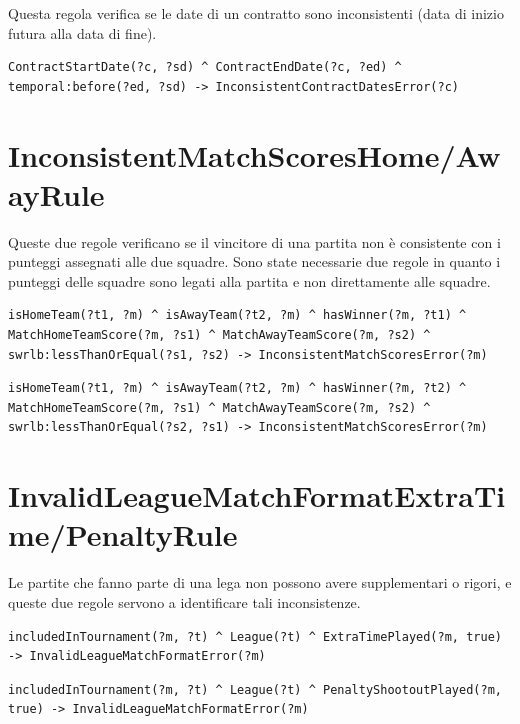 \documentclass[11pt]{report} %
\begin{document}
Questa regola verifica se le date di un contratto sono inconsistenti (data di inizio futura alla data di fine).

\begin{lstlisting}[language=SWRL]
ContractStartDate(?c, ?sd) ^ ContractEndDate(?c, ?ed) ^ temporal:before(?ed, ?sd) -> InconsistentContractDatesError(?c)
\end{lstlisting}

\section{InconsistentMatchScoresHome/AwayRule}

Queste due regole verificano se il vincitore di una partita non è consistente con i punteggi assegnati alle due squadre.
Sono state necessarie due regole in quanto i punteggi delle squadre sono legati alla partita e non direttamente alle squadre.

\begin{lstlisting}[language=SWRL]
isHomeTeam(?t1, ?m) ^ isAwayTeam(?t2, ?m) ^ hasWinner(?m, ?t1) ^ MatchHomeTeamScore(?m, ?s1) ^ MatchAwayTeamScore(?m, ?s2) ^ swrlb:lessThanOrEqual(?s1, ?s2) -> InconsistentMatchScoresError(?m)
\end{lstlisting}

\begin{lstlisting}[language=SWRL]
isHomeTeam(?t1, ?m) ^ isAwayTeam(?t2, ?m) ^ hasWinner(?m, ?t2) ^ MatchHomeTeamScore(?m, ?s1) ^ MatchAwayTeamScore(?m, ?s2) ^ swrlb:lessThanOrEqual(?s2, ?s1) -> InconsistentMatchScoresError(?m)
\end{lstlisting}

\section{InvalidLeagueMatchFormatExtraTime/PenaltyRule}

Le partite che fanno parte di una lega non possono avere supplementari o rigori, e queste due regole servono a identificare tali inconsistenze.

\begin{lstlisting}[language=SWRL]
includedInTournament(?m, ?t) ^ League(?t) ^ ExtraTimePlayed(?m, true) -> InvalidLeagueMatchFormatError(?m)
\end{lstlisting}

\begin{lstlisting}[language=SWRL]
includedInTournament(?m, ?t) ^ League(?t) ^ PenaltyShootoutPlayed(?m, true) -> InvalidLeagueMatchFormatError(?m)
\end{lstlisting}
\end{document}
